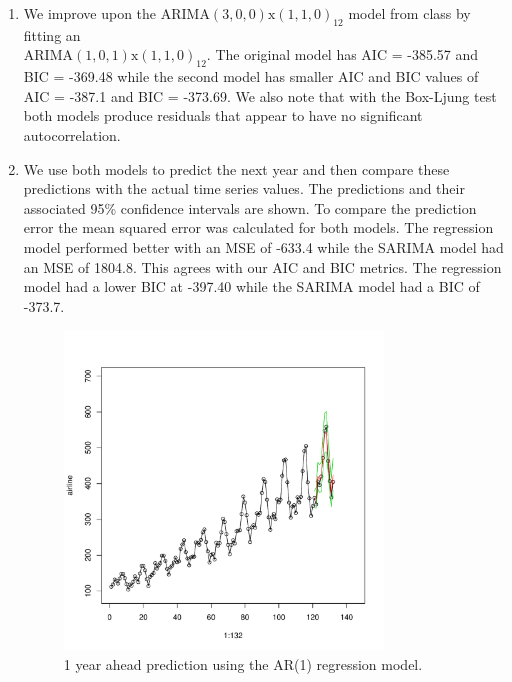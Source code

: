 \documentclass[12pt]{article}
\newenvironment{solution}[2][Solution]{\begin{trivlist}
	\item[\hskip \labelsep {\bfseries #1}]}{\end{trivlist}}
\begin{document}
\begin{solution}{}
\begin{enumerate}[label=(\alph*)]
		\item We improve upon the ARIMA$(3,0,0)\text{x}(1,1,0)_{12}$ model from class by fitting an \\
		ARIMA$(1,0,1)\text{x}(1,1,0)_{12}$. The original model has AIC = -385.57 and BIC = -369.48 while the second model has smaller AIC and BIC values of AIC = -387.1 and BIC = -373.69. We also note that with the Box-Ljung test both models produce residuals that appear to have no significant autocorrelation. 
		
		\item	 We use both models to predict the next year and then compare these predictions with the actual time series values. The predictions and their associated 95\% confidence intervals are shown. To compare the prediction error the mean squared error was calculated for both models. The regression model performed better with an MSE of -633.4 while the SARIMA model had an MSE of 1804.8. This agrees with our AIC and BIC metrics. The regression model had a lower BIC at -397.40 while the SARIMA model had a BIC of -373.7. 
		
	\begin{figure}[H]
    		\centering
    		\includegraphics[width=0.8\textwidth]{figs/problem_8/reg_pred.pdf}
    		\caption{1 year ahead prediction using the AR(1) regression model.}
    		\label{fig:reg_pred}
	\end{figure}
	

\end{enumerate}
\end{solution}
\end{document}
